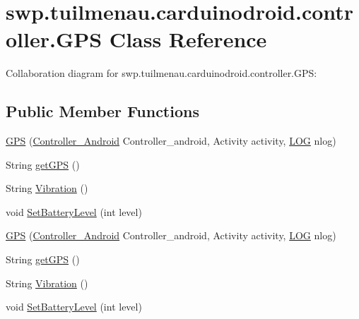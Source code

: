 \hypertarget{classswp_1_1tuilmenau_1_1carduinodroid_1_1controller_1_1_g_p_s}{}\section{swp.\+tuilmenau.\+carduinodroid.\+controller.\+G\+P\+S Class Reference}
\label{classswp_1_1tuilmenau_1_1carduinodroid_1_1controller_1_1_g_p_s}


Collaboration diagram for swp.\+tuilmenau.\+carduinodroid.\+controller.\+G\+P\+S\+:
\subsection*{Public Member Functions}
\begin{DoxyCompactItemize}
\item 
\hyperlink{classswp_1_1tuilmenau_1_1carduinodroid_1_1controller_1_1_g_p_s_acb77cfc88d86505b4442741310c179e8}{G\+P\+S} (\hyperlink{classswp_1_1tuilmenau_1_1carduinodroid_1_1controller_1_1_controller___android}{Controller\+\_\+\+Android} Controller\+\_\+android, Activity activity, \hyperlink{classswp_1_1tuilmenau_1_1carduinodroid_1_1model_1_1_l_o_g}{L\+O\+G} nlog)
\item 
String \hyperlink{classswp_1_1tuilmenau_1_1carduinodroid_1_1controller_1_1_g_p_s_aba91a5991ec2a3b6d0c33da46e9b5121}{get\+G\+P\+S} ()
\item 
String \hyperlink{classswp_1_1tuilmenau_1_1carduinodroid_1_1controller_1_1_g_p_s_afda4a9143b1495da7da755c6d07a42d9}{Vibration} ()
\item 
void \hyperlink{classswp_1_1tuilmenau_1_1carduinodroid_1_1controller_1_1_g_p_s_a61b2fb547dafc37ccfa1bf4c9137ae59}{Set\+Battery\+Level} (int level)
\item 
\hyperlink{classswp_1_1tuilmenau_1_1carduinodroid_1_1controller_1_1_g_p_s_acb77cfc88d86505b4442741310c179e8}{G\+P\+S} (\hyperlink{classswp_1_1tuilmenau_1_1carduinodroid_1_1controller_1_1_controller___android}{Controller\+\_\+\+Android} Controller\+\_\+android, Activity activity, \hyperlink{classswp_1_1tuilmenau_1_1carduinodroid_1_1model_1_1_l_o_g}{L\+O\+G} nlog)
\item 
String \hyperlink{classswp_1_1tuilmenau_1_1carduinodroid_1_1controller_1_1_g_p_s_aba91a5991ec2a3b6d0c33da46e9b5121}{get\+G\+P\+S} ()
\item 
String \hyperlink{classswp_1_1tuilmenau_1_1carduinodroid_1_1controller_1_1_g_p_s_afda4a9143b1495da7da755c6d07a42d9}{Vibration} ()
\item 
void \hyperlink{classswp_1_1tuilmenau_1_1carduinodroid_1_1controller_1_1_g_p_s_a61b2fb547dafc37ccfa1bf4c9137ae59}{Set\+Battery\+Level} (int level)
\end{DoxyCompactItemize}
